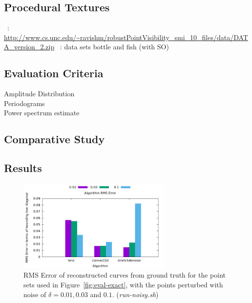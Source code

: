 \subsection{Procedural Textures}


~\cite{mehra2010visibility}: \url{http://www.cs.unc.edu/~ravishm/robustPointVisibility_smi_10_files/data/DATA_version_2.zip}
~\cite{lee2000curve}: data sets bottle and fish (with SO)


\subsection{Evaluation Criteria}

Amplitude Distribution\\


Periodograms\\

Power spectrum estimate\\



\subsection{Comparative Study}




\subsection{Results}


\begin{figure}
	\centering
	\includegraphics[width=3in]{fig/noisy.pdf}
	\caption{RMS Error of reconstructed curves from ground truth for the point sets used in Figure~\ref{fig:eval-exact}, with the points perturbed with noise of $\delta=0.01, 0.03$ and $0.1$. ({\em run-noisy.sh})}
	\label{fig:eval-noisy}
\end{figure}

